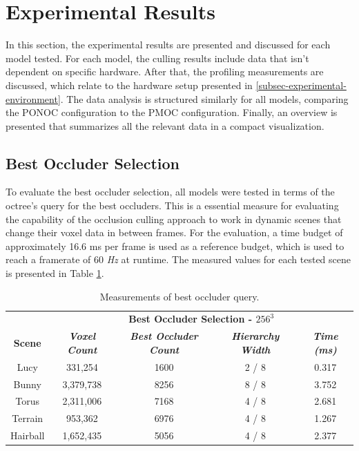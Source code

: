 \section{Experimental Results}

In this section, the experimental results are presented and discussed for each model tested.
For each model, the culling results include data that isn't dependent on specific hardware. 
After that, the profiling measurements are discussed, which relate to the hardware setup presented 
in \ref{subsec-experimental-environment}. The data analysis is structured similarly for all models,
comparing the \ac{PONOC} configuration to the \ac{PMOC} configuration. Finally, an overview 
is presented that summarizes all the relevant data in a compact visualization.


\subsection*{Best Occluder Selection}

To evaluate the best occluder selection, all models were tested in terms of the octree's 
query for the best occluders. This is a essential measure for evaluating the capability 
of the occlusion culling approach to work in dynamic scenes that change their voxel 
data in between frames. For the evaluation, a time budget of approximately 16.6 ms per 
frame is used as a reference budget, which is used to reach a framerate of 60 \emph{Hz} 
at runtime. The measured values for each tested scene is presented in Table \ref{tab:best-occluder-query}. 

\begin{table}[htbp]
  \begin{center}
    \begin{tabular}{|c|c|c|c|c|}
      \hline
      \textbf{}&\multicolumn{4}{|c|}{\textbf{Best Occluder Selection - $256^3$}} \\
      \cline{2-5} 
      \textbf{Scene} & \textbf{\textit{Voxel Count}}& \textbf{\textit{Best Occluder Count}}& \textbf{\textit{Hierarchy Width}}& \textbf{\textit{Time (ms)}} \\
      \hline
      Lucy        & 331,254   & 1600 & 2 / 8  & 0.317 \\
      Bunny       & 3,379,738 & 8256 & 8 / 8  & 3.752 \\
      Torus       & 2,311,006 & 7168 & 4 / 8  & 2.681 \\
      Terrain     & 953,362   & 6976 & 4 / 8  & 1.267 \\
      Hairball    & 1,652,435 & 5056 & 4 / 8  & 2.377 \\
      \hline
    \end{tabular}
    \caption{Measurements of best occluder query.}
  \label{tab:best-occluder-query}
  \end{center}
\end{table}

